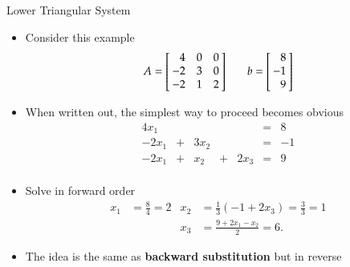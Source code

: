 \documentclass[10pt]{beamer}
\begin{document}
\begin{frame}{Lower Triangular System}
\begin{itemize}
    \item Consider this example
    \begin{equation*}
        A = \left[\negthickspace\begin{array}{rrr} 
            4 & 0 & 0 \\
            -2 & 3 & 0 \\ 
            -2 & 1 & 2 \\ 
            \end{array}\negthickspace\right]
        \ \ \ \ \ \ \
        b = \left[\negthickspace\begin{array}{r} 
        8 \\
        -1 \\
        9 \\
        \end{array}\negthickspace\right]
    \end{equation*}

\item When written out, the simplest way to proceed becomes obvious
\begin{equation*}
    \begin{array}{rcrcrcr}
         4x_1    &   &        &   &   &= &  8  \\
         -2x_1    &  + &  3x_2  &  &  &= & -1  \\
      -2 x_1 & + &   x_2  & + &  2x_3 &= &  9  \\
    \end{array}
\end{equation*}

\item Solve in forward order 
\begin{align*}
      x_1 &= \frac{8}{4} = 2
    & x_2 &= \frac{1}{3} \left( -1 + 2 x_3 \right) = \frac{3}{3} = 1
    \\
    & &  x_3 &= \frac{9+2x_1-x_2}{2}=6.
\end{align*}

\item The idea is the same as \textbf{backward substitution} but in reverse

\end{itemize}
\end{frame}

\end{document}
